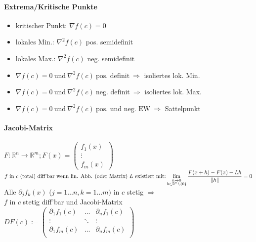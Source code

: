 \documentclass[paper=a3,paper=landscape, fontsize=9pt, DIV=30]{scrartcl}
\newcommand{\real}{{\mathbb{R}}}
\begin{document}
\begin{multicols*}{4}
  \paragraph{Extrema/Kritische Punkte}
  \begin{itemize}
  	\item kritischer Punkt: $\nabla f(c) = 0$
  	\item lokales Min.: $\nabla^2f(c)$ pos. semidefinit
  	\item lokales Max.: $\nabla^2f(c)$ neg. semidefinit
  	\item $\nabla f(c)=0 \ \text{und}\ \nabla^2f(c) \ \text{pos. definit}\ \Rightarrow$ isoliertes lok. Min.
  	\item  $\nabla f(c)=0 \ \text{und}\ \nabla^2f(c) \ \text{neg. definit}\ \Rightarrow$ isoliertes lok. Max.
  	\item $\nabla f(c)=0 \ \text{und}\ \nabla^2f(c) \ \text{pos. und neg. EW}\ \Rightarrow$ Sattelpunkt
  \end{itemize}

  \paragraph{Jacobi-Matrix}

  $F: \real^n \rightarrow \real^m; F(x) =
  \begin{pmatrix}
    f_1(x)\\
    \vdots \\
    f_m(x)
  \end{pmatrix}
  $ \\
  $f \ \text{in}\ c \ \text{(total) diff'bar wenn lin. Abb. (oder Matrix)}\ L \ \text{existiert mit:}\\ \displaystyle\lim_{\substack{h \rightarrow 0\\ h \in \real^n \setminus \{0\} }} \frac{F(x+h)-F(x)-Lh}{\|h\|} = 0$\\
  Alle $\partial_jf_k(x)$ ($j=1 \dots n,k=1 \dots m)$ in $c$ stetig $\Rightarrow$\\
  $f$ in $c$ stetig diff'bar und Jacobi-Matrix \\
  $DF(c) :=
  \begin{pmatrix}
    \partial_1f_1(c) & \dots   & \partial_nf_1(c) \\
    \vdots           & \ddots  & \vdots          \\
    \partial_1f_m(c) & \dots   & \partial_nf_m(c) \\
  \end{pmatrix}
  $


\end{multicols*}
\end{document}
